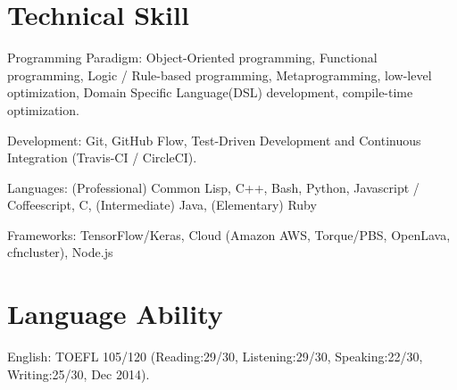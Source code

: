 \documentclass[letterpaper,11pt]{article}
\begin{document}
\renewcommand{\refname}{Selected Publications}

{
\let\uline\relax
\nocite{Asai2018}
\nocite{Asai2017e}
\nocite{Asai2017b}
\nocite{Asai2017}
\nocite{Asai2016b}
\nocite{Asai2016}
\nocite{Asai2015}
\nocite{Asai2014}




}




\section{Technical Skill}

\begin{CV}
 \item[Programming Paradigm:] %
 Object-Oriented programming,
 Functional programming,
 Logic / Rule-based programming,
 Metaprogramming, low-level optimization,
 Domain Specific Language(DSL) development, compile-time optimization.
 \item[Development:] Git, GitHub Flow, Test-Driven Development and Continuous Integration (Travis-CI / CircleCI).
 \item[Languages:]
 (Professional) Common Lisp, C++, Bash, Python, Javascript / Coffeescript, C,
 (Intermediate) Java,
 (Elementary)   Ruby
 \item[Frameworks:] TensorFlow/Keras, Cloud (Amazon AWS, Torque/PBS, OpenLava, cfncluster),
 Node.js%
\end{CV}

\section{Language Ability}

\begin{CV}
 \item[English:] TOEFL 105/120 (Reading:29/30, Listening:29/30,
 Speaking:22/30, Writing:25/30, Dec 2014).
\end{CV}
\end{document}
